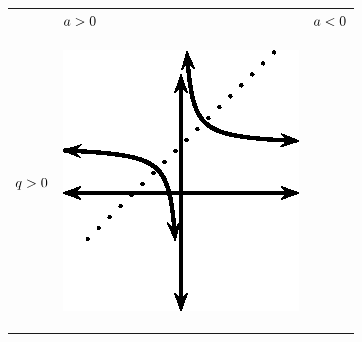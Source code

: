         \begin{center}
      \label{m39341*uid151}
    \noindent
      \tablelasttail{}
      \begin{xtabular*}{\mytablewidth}[t]{|p{10\mystarwidth}|p{10\mystarwidth}|p{10\mystarwidth}|}\hline
         &
                  $a>{}0$
                 &
                  $a<{}0$
     \tabularnewline{}
                  $q>{}0$
                 &
    \setcounter{subfigure}{0}
\label{m39341*id246931}
    \begin{center}
    \label{m39341*id246931!!!underscore!!!media}\label{m39341*id246931!!!underscore!!!printimage}\includegraphics[width=.3\columnwidth]{col11306.imgs/m39341_MG10C11_022.png} %
      \vspace{2pt}
    \vspace{.1in}
    \end{center}    

\end{xtabular*}
\end{center}
